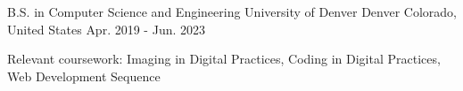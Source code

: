 

\begin{cventries}

  \cventry
    {B.S. in Computer Science and Engineering} %
    {University of Denver} %
    {Denver Colorado, United States} %
    {Apr. 2019 - Jun. 2023} %
    {
      \begin{cvitems} %
        \item {Relevant coursework: Imaging in Digital Practices, Coding in Digital Practices, Web Development Sequence}
      \end{cvitems}
    }

\end{cventries}
